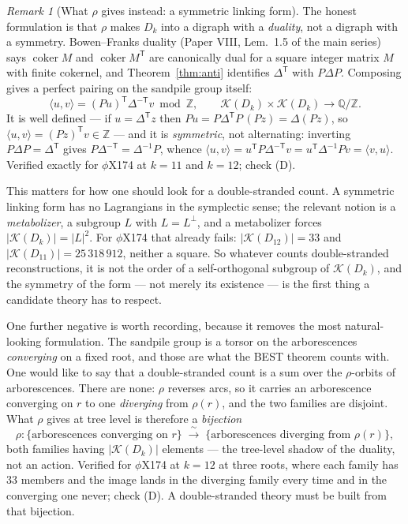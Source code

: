 \documentclass[11pt]{article}
\theoremstyle{plain}
\theoremstyle{definition}
\theoremstyle{remark}
\newtheorem{remark}[theorem]{Remark}
\newcommand{\Z}{\mathbb{Z}}
\newcommand{\Q}{\mathbb{Q}}
\newcommand{\K}{\mathcal{K}}
\newcommand{\coker}{\operatorname{coker}}
\begin{document}
\begin{remark}[What $\rho$ gives instead: a symmetric linking form]\label{rem:pairing}
The honest formulation is that $\rho$ makes $D_k$ into a digraph with a \emph{duality}, not a
digraph with a symmetry. Bowen--Franks duality (Paper VIII, Lem.~1.5 of the main series) says
$\coker M$ and $\coker M^{\mathsf T}$ are canonically dual for a square integer matrix $M$
with finite cokernel, and Theorem~\ref{thm:anti} identifies $\Delta^{\mathsf T}$ with
$P\Delta P$. Composing gives a perfect pairing on the sandpile group itself:
\[
  \langle u,v\rangle=(Pu)^{\mathsf T}\Delta^{-\mathsf T}v \bmod \Z,
  \qquad \K(D_k)\times\K(D_k)\longrightarrow\Q/\Z .
\]
It is well defined --- if $u=\Delta^{\mathsf T}z$ then $Pu=P\Delta^{\mathsf T}P\,(Pz)=
\Delta(Pz)$, so $\langle u,v\rangle=(Pz)^{\mathsf T}v\in\Z$ --- and it is
\emph{symmetric}, not alternating: inverting $P\Delta P=\Delta^{\mathsf T}$ gives
$P\Delta^{-\mathsf T}=\Delta^{-1}P$, whence
$\langle u,v\rangle=u^{\mathsf T}P\Delta^{-\mathsf T}v=u^{\mathsf T}\Delta^{-1}Pv=
\langle v,u\rangle$. Verified exactly for $\phi$X174 at $k=11$ and $k=12$; check (D).

This matters for how one should look for a double-stranded count. A symmetric linking form
has no Lagrangians in the symplectic sense; the relevant notion is a \emph{metabolizer}, a
subgroup $L$ with $L=L^{\perp}$, and a metabolizer forces $|\K(D_k)|=|L|^{2}$. For $\phi$X174
that already fails: $|\K(D_{12})|=33$ and $|\K(D_{11})|=25\,318\,912$, neither a square. So
whatever counts double-stranded reconstructions, it is not the order of a self-orthogonal
subgroup of $\K(D_k)$, and the symmetry of the form --- not merely its existence --- is the
first thing a candidate theory has to respect.

One further negative is worth recording, because it removes the most natural-looking
formulation. The sandpile group is a torsor on the arborescences \emph{converging} on a fixed
root, and those are what the BEST theorem counts with. One would like to say that a
double-stranded count is a sum over the $\rho$-orbits of arborescences. There are none:
$\rho$ reverses arcs, so it carries an arborescence converging on $r$ to one
\emph{diverging} from $\rho(r)$, and the two families are disjoint. What $\rho$ gives at
tree level is therefore a \emph{bijection}
\[
  \rho\colon \{\text{arborescences converging on } r\}
  \;\xrightarrow{\ \sim\ }\;
  \{\text{arborescences diverging from } \rho(r)\},
\]
both families having $|\K(D_k)|$ elements --- the tree-level shadow of the duality, not an
action. Verified for $\phi$X174 at $k=12$ at three roots, where each family has $33$ members
and the image lands in the diverging family every time and in the converging one never;
check (D). A double-stranded theory must be built from that bijection.
\end{remark}
\end{document}
